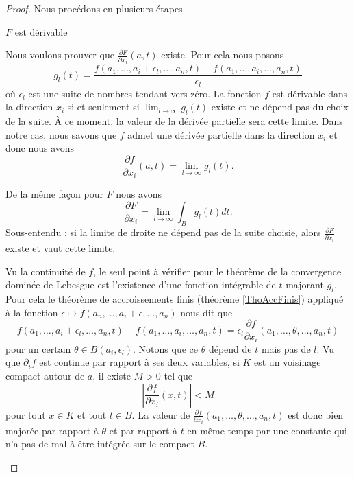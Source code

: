 \begin{proof}
    Nous procédons en plusieurs étapes.
    \begin{subproof}
    \item[\( F\) est dérivable]
            
        Nous voulons prouver que \( \frac{ \partial F }{ \partial x_i }(a,t)\) existe. Pour cela nous posons
        \begin{equation}
            g_l(t)=\frac{ f(a_1,\ldots, a_i+\epsilon_l,\ldots, a_n,t)-f(a_1,\ldots, a_i,\ldots, a_n,t) }{ \epsilon_l }
        \end{equation}
        où \( \epsilon_l\) est une suite de nombres tendant vers zéro. La fonction \( f\) est dérivable dans la direction \( x_i\) si et seulement si \( \lim_{l\to \infty}g_l(t) \) existe et ne dépend pas du choix de la suite. À ce moment, la valeur de la dérivée partielle sera cette limite. Dans notre cas, nous savons que \( f\) admet une dérivée partielle dans la direction \( x_i\) et donc nous avons
        \begin{equation}
            \frac{ \partial f }{ \partial x_i }(a,t)=\lim_{l\to \infty} g_l(t).
        \end{equation}
        
        De la même façon pour \( F\) nous avons
        \begin{equation}
            \frac{ \partial F }{ \partial x_i }=\lim_{l\to \infty} \int_{B}g_l(t)dt.
        \end{equation}
        Sous-entendu : si la limite de droite ne dépend pas de la suite choisie, alors \( \frac{ \partial F }{ \partial x_i }\) existe et vaut cette limite.

        Vu la continuité de \( f\), le seul point à vérifier pour le théorème de la convergence dominée de Lebesgue est l'existence d'une fonction intégrable de \( t\) majorant \( g_l\). Pour cela le théorème de accroissements finis (théorème \ref{ThoAccFinis}) appliqué à la fonction \( \epsilon\mapsto f(a_n,\ldots, a_i+\epsilon,\ldots, a_n)\) nous dit que
        \begin{equation}
            f(a_1,\ldots, a_i+\epsilon_l,\ldots, a_n,t)-f(a_1,\ldots, a_i,\ldots, a_n,t)=\epsilon_l\frac{ \partial f }{ \partial x_i }(a_1,\ldots, \theta,\ldots, a_n,t)
        \end{equation}
        pour un certain \( \theta\in B(a_i,\epsilon_l)\). Notons que ce \( \theta\) dépend de \( t\) mais pas de \( l\). Vu que \( \partial_if\) est continue par rapport à ses deux variables, si \( K\) est un voisinage compact autour de \( a\), il existe \( M>0\) tel que
        \begin{equation}    \label{EqMXqviPC}
            \left| \frac{ \partial f }{ \partial x_i }(x,t) \right| < M
        \end{equation}
        pour tout \( x\in K\) et tout \( t\in B\). La valeur de \( \frac{ \partial f }{ \partial x_i }(a_1,\ldots, \theta,\ldots, a_n,t)\) est donc bien majorée par rapport à \( \theta\) et par rapport à \( t\) en même temps par une constante qui n'a pas de mal à être intégrée sur le compact \( B\).
        

\end{subproof}
\end{proof}
